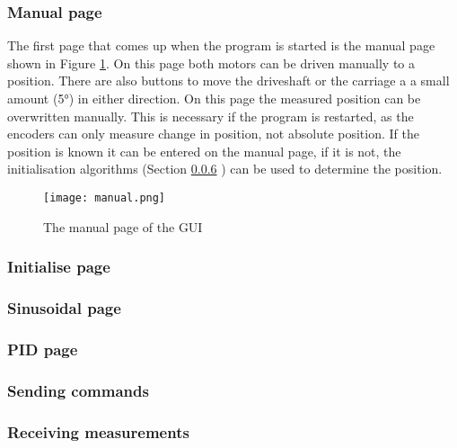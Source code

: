 \documentclass[12pt]{article}
\begin{document}
\subsubsection{Manual page}
The first page that comes up when the program is started is the manual page shown in Figure \ref{fig:manual}. On this page both motors can be driven manually to a position. There are also buttons to move the driveshaft or the carriage a a small amount (5°) in either direction. On this page the measured position can be overwritten manually. This is necessary if the program is restarted, as the encoders can only measure change in position, not absolute position. If the position is known it can be entered on the manual page, if it is not, the initialisation algorithms (Section \ref{} \todo) can be used to determine the position.

\begin{figure}[h]
    \centering
    \texttt{[image: manual.png]}
    \caption{The manual page of the GUI}
    \label{fig:manual}
\end{figure}

\subsubsection{Initialise page}
\subsubsection{Sinusoidal page}
\subsubsection{PID page}

\subsubsection{Sending commands}
\subsubsection{Receiving measurements}
\end{document}
